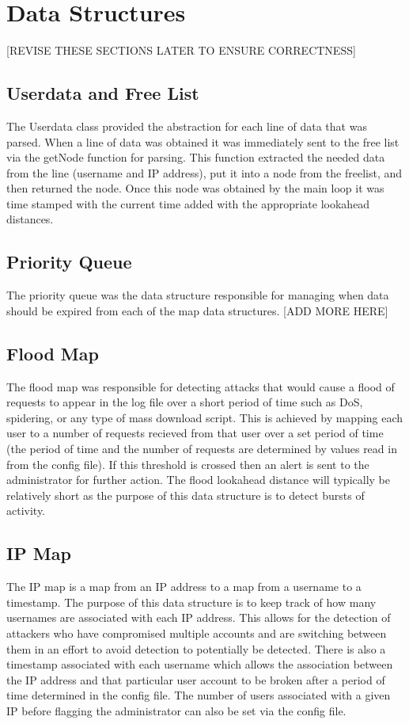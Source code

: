 \documentclass[12pt]{report}
\begin{document}
\section*{Data Structures}
	[REVISE THESE SECTIONS LATER TO ENSURE CORRECTNESS]
	\subsection*{Userdata and Free List}
	The Userdata class provided the abstraction for each line of data that
	was parsed. When a line of data was obtained it was immediately sent to the
	free list via the getNode function for parsing. This function extracted the
	needed data from the line (username and IP address), put it into a node from
	the freelist, and then returned the node. Once this node was obtained by the 
	main loop it was time stamped with the current time added with the appropriate	lookahead distances.
	
	\subsection*{Priority Queue}
	The priority queue was the data	structure responsible for managing when data 
	should be expired from each of the map data structures. [ADD MORE HERE]

	\subsection*{Flood Map}
	The flood map was responsible for detecting attacks that would cause a flood 
	of requests to appear in the log file over a short period of time such as
	DoS, spidering, or any type of mass download script. This is achieved by mapping
	each user to a number of requests recieved from that user over a set period of time
	(the period of time and the number of requests are determined by values read in from
	the config file). If this threshold is crossed then an alert is sent to the administrator for further action. The flood lookahead distance will typically be
	relatively short as the purpose of this data structure is to detect bursts of 
	activity.

	\subsection*{IP Map}
	The IP map is a map from an IP address to a map from a username to a timestamp.
	The purpose of this data structure is to keep track of how many usernames are
	associated with each IP address. This allows for the detection of attackers who
	have compromised multiple accounts and are switching between them in an effort to avoid detection to potentially be detected. There is also a timestamp associated
	with each username which allows the association between the IP address and that
	particular user account to be broken after a period of time determined in the 
	config file. The number of users associated with a given IP before flagging the
	administrator can also be set via the config file.
\end{document}
